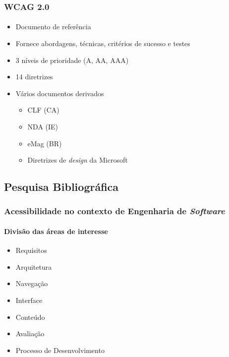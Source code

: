 \documentclass{beamer}
\begin{document}
\begin{frame}
\frametitle{WCAG 2.0}
\framesubtitle{}

\begin{itemize}
  \item Documento de referência
  \item Fornece abordagens, técnicas, critérios de sucesso e testes
  \item 3 níveis de prioridade (A, AA, AAA)
  \item 14 diretrizes
  \item Vários documentos derivados
  \begin{itemize}
   	\item CLF (CA) \citep{clf:13}
   	\item NDA (IE) \citep{nda:13}
   	\item eMag (BR) \citep{emag:13}
   	\item Diretrizes de \textit{design} da Microsoft \citep{microsoft:11}   	
   \end{itemize}
\end{itemize}

\end{frame}

\subsection[Pesquisa Bibliográfica]{Pesquisa Bibliográfica}

\begin{frame}
\frametitle{Acessibilidade no contexto de Engenharia de \textit{Software}}
\framesubtitle{Divisão das áreas de interesse}

\begin{itemize}
  \item Requisitos
  \item Arquitetura
  \item Navegação
  \item Interface
  \item Conteúdo
  \item Avaliação
  \item Processo de Desenvolvimento
\end{itemize}

\end{frame}
\end{document}
